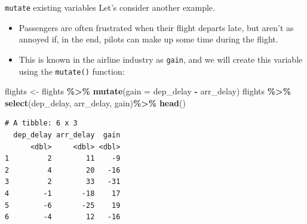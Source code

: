\documentclass[
  ignorenonframetext,
]{beamer}
\newenvironment{Shaded}{\begin{snugshade}}{\end{snugshade}}
\newcommand{\AttributeTok}[1]{\textcolor[rgb]{0.13,0.29,0.53}{#1}}
\newcommand{\FunctionTok}[1]{\textcolor[rgb]{0.13,0.29,0.53}{\textbf{#1}}}
\newcommand{\NormalTok}[1]{#1}
\newcommand{\OtherTok}[1]{\textcolor[rgb]{0.56,0.35,0.01}{#1}}
\newcommand{\SpecialCharTok}[1]{\textcolor[rgb]{0.81,0.36,0.00}{\textbf{#1}}}
\begin{document}
\begin{frame}[fragile]{\texttt{mutate} existing variables}
\protect\hypertarget{mutate-existing-variables-3}{}
Let's consider another example.

\begin{itemize}
\item
  Passengers are often frustrated when their flight departs late, but
  aren't as annoyed if, in the end, pilots can make up some time during
  the flight.
\item
  This is known in the airline industry as \texttt{gain}, and we will
  create this variable using the \texttt{mutate()} function:
\end{itemize}

\tiny

\begin{Shaded}
\begin{Highlighting}[]
\NormalTok{flights }\OtherTok{\textless{}{-}}\NormalTok{ flights }\SpecialCharTok{\%\textgreater{}\%} 
  \FunctionTok{mutate}\NormalTok{(}\AttributeTok{gain =}\NormalTok{ dep\_delay }\SpecialCharTok{{-}}\NormalTok{ arr\_delay)}
\NormalTok{flights  }\SpecialCharTok{\%\textgreater{}\%} \FunctionTok{select}\NormalTok{(dep\_delay, arr\_delay, gain)}\SpecialCharTok{\%\textgreater{}\%} \FunctionTok{head}\NormalTok{()}
\end{Highlighting}
\end{Shaded}

\begin{verbatim}
# A tibble: 6 x 3
  dep_delay arr_delay  gain
      <dbl>     <dbl> <dbl>
1         2        11    -9
2         4        20   -16
3         2        33   -31
4        -1       -18    17
5        -6       -25    19
6        -4        12   -16
\end{verbatim}

\normalsize
\end{frame}
\end{document}
